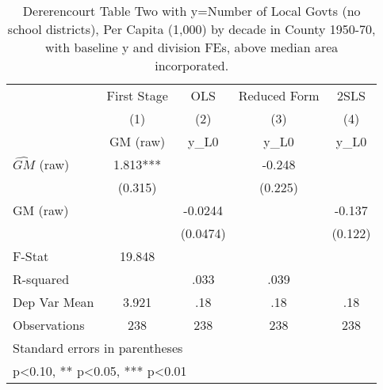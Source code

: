 \begin{table}[htbp]\centering
\def\sym#1{\ifmmode^{#1}\else\(^{#1}\)\fi}
\caption{Dererencourt Table Two with y=Number of Local Govts (no school districts), Per Capita (1,000) by decade in County 1950-70, with baseline y and division FEs, above median area incorporated.}
\begin{tabular}{l*{4}{c}}
\toprule
                    & First Stage   &         OLS   &Reduced Form   &        2SLS   \\
                    &\multicolumn{1}{c}{(1)}&\multicolumn{1}{c}{(2)}&\multicolumn{1}{c}{(3)}&\multicolumn{1}{c}{(4)}\\
                    &\multicolumn{1}{c}{GM  (raw)}&\multicolumn{1}{c}{y\_L0}&\multicolumn{1}{c}{y\_L0}&\multicolumn{1}{c}{y\_L0}\\
\midrule
$\hat{GM}$ (raw)    &       1.813***&               &      -0.248   &               \\
                    &     (0.315)   &               &     (0.225)   &               \\
\addlinespace
GM  (raw)           &               &     -0.0244   &               &      -0.137   \\
                    &               &    (0.0474)   &               &     (0.122)   \\
\midrule
F-Stat              &      19.848   &               &               &               \\
R-squared           &               &        .033   &        .039   &               \\
Dep Var Mean        &       3.921   &         .18   &         .18   &         .18   \\
Observations        &         238   &         238   &         238   &         238   \\
\bottomrule
\multicolumn{5}{l}{\footnotesize Standard errors in parentheses}\\
\multicolumn{5}{l}{\footnotesize * p<0.10, ** p<0.05, *** p<0.01}\\
\end{tabular}
\end{table}

